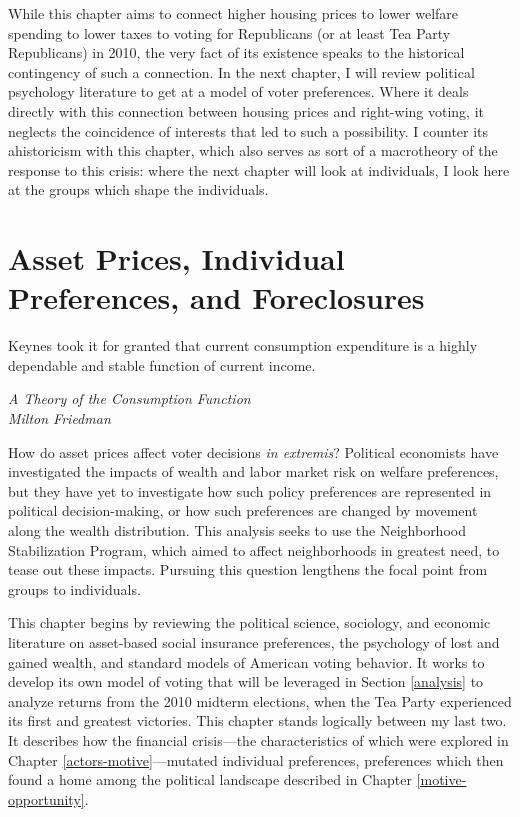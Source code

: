 \documentclass[12pt,oneside]{psthesis}
\begin{document}
While this chapter aims to connect higher housing prices to lower welfare spending to lower taxes to voting for Republicans (or at least Tea Party Republicans) in 2010, the very fact of its existence speaks to the historical contingency of such a connection.
In the next chapter, I will review political psychology literature to get at a model of voter preferences.
Where it deals directly with this connection between housing prices and right-wing voting, it neglects the coincidence of interests that led to such a possibility.
I counter its ahistoricism with this chapter, which also serves as sort of a macrotheory of the response to this crisis: where the next chapter will look at individuals, I look here at the groups which shape the individuals.

\hypertarget{methods}{%
\chapter{Asset Prices, Individual Preferences, and Foreclosures}\label{methods}}

\epigraph{Keynes took it for granted that current consumption expenditure is a highly dependable and stable function of current income.}{\textit{A Theory of the Consumption Function \\ Milton Friedman}}

How do asset prices affect voter decisions \emph{in extremis}?
Political economists have investigated the impacts of wealth and labor market risk on welfare preferences, but they have yet to investigate how such policy preferences are represented in political decision-making, or how such preferences are changed by movement along the wealth distribution.
This analysis seeks to use the Neighborhood Stabilization Program, which aimed to affect neighborhoods in greatest need, to tease out these impacts.
Pursuing this question lengthens the focal point from groups to individuals.

This chapter begins by reviewing the political science, sociology, and economic literature on asset-based social insurance preferences, the psychology of lost and gained wealth, and standard models of American voting behavior.
It works to develop its own model of voting that will be leveraged in Section \ref{analysis} to analyze returns from the 2010 midterm elections, when the Tea Party experienced its first and greatest victories.
This chapter stands logically between my last two.
It describes how the financial crisis---the characteristics of which were explored in Chapter \ref{actors-motive}---mutated individual preferences, preferences which then found a home among the political landscape described in Chapter \ref{motive-opportunity}.
\end{document}
